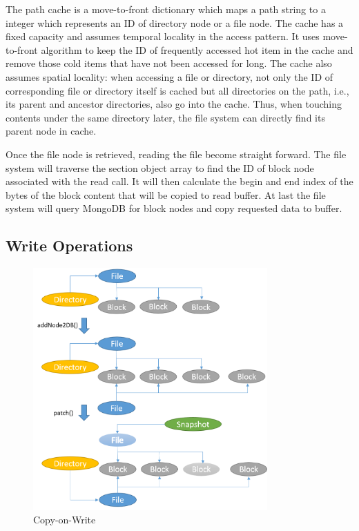    The path cache is a move-to-front dictionary \cite{mtf} which maps a path string to a integer which represents an ID of directory node or a file node. The cache has a fixed capacity and assumes temporal locality in the access pattern. It uses move-to-front algorithm to keep the ID of frequently accessed hot item in the cache and remove those cold items that have not been accessed for long. The cache also assumes spatial locality: when accessing a file or directory, not only the ID of corresponding file or directory itself is cached but all directories on the path, i.e., its parent and ancestor directories, also go into the cache. Thus, when touching contents under the same directory later, the file system can directly find its parent node in cache.

    Once the file node is retrieved, reading the file become straight forward. The file system will traverse the section object array to find the ID of block node associated with the read call. It will then calculate the begin and end index of the bytes of the block content that will be copied to read buffer. At last the file system will query MongoDB for block nodes and copy requested data to buffer.

\subsection{Write Operations}

\begin{figure}[t]
\centering
\includegraphics[width=0.8\textwidth]{Chapter-3/figs/fig10.png}
\caption{Copy-on-Write}
\label{fig:cow}
\end{figure}

